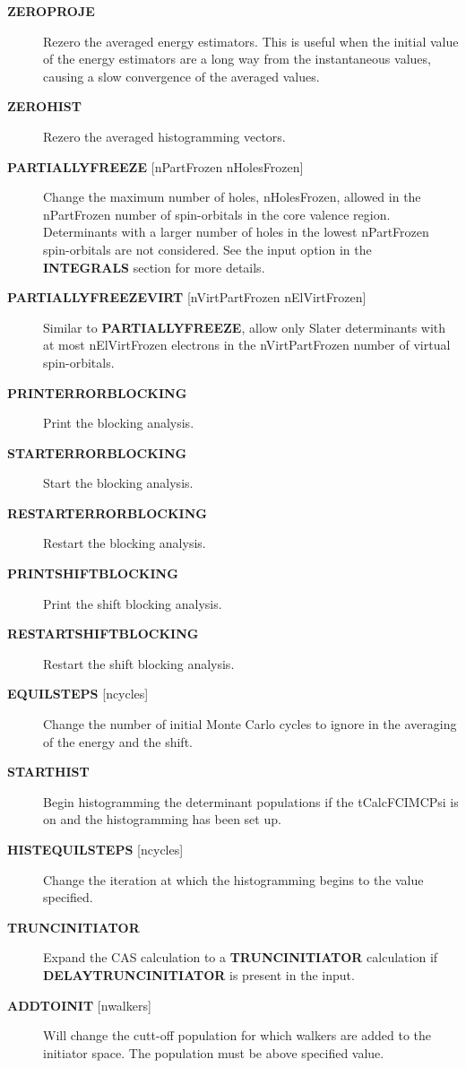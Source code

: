 \documentclass[openany,a4paper,10pt,english]{manual}
\begin{document}
\begin{description}
\item[\textbf{ZEROPROJE}] \leavevmode
Rezero the averaged energy estimators.  This is useful when the initial value of
the energy estimators are a long way from the instantaneous values, causing a
slow convergence of the averaged values.

\item[\textbf{ZEROHIST}] \leavevmode
Rezero the averaged histogramming vectors.

\item[\textbf{PARTIALLYFREEZE} {[}nPartFrozen nHolesFrozen{]}] \leavevmode
Change the maximum number of holes, nHolesFrozen, allowed in the nPartFrozen
number of spin-orbitals in the core valence region.
Determinants with a larger number of holes in the lowest nPartFrozen
spin-orbitals are not considered.
See the input option in the \textbf{INTEGRALS} section for more details.

\item[\textbf{PARTIALLYFREEZEVIRT} {[}nVirtPartFrozen nElVirtFrozen{]}] \leavevmode
Similar to \textbf{PARTIALLYFREEZE}, allow only Slater determinants with
at most nElVirtFrozen electrons in the nVirtPartFrozen number of virtual
spin-orbitals.

\item[\textbf{PRINTERRORBLOCKING}] \leavevmode
Print the blocking analysis.

\item[\textbf{STARTERRORBLOCKING}] \leavevmode
Start the blocking analysis.

\item[\textbf{RESTARTERRORBLOCKING}] \leavevmode
Restart the blocking analysis.

\item[\textbf{PRINTSHIFTBLOCKING}] \leavevmode
Print the shift blocking analysis.

\item[\textbf{RESTARTSHIFTBLOCKING}] \leavevmode
Restart the shift blocking analysis.

\item[\textbf{EQUILSTEPS} {[}ncycles{]}] \leavevmode
Change the number of initial Monte Carlo cycles to ignore in the averaging
of the energy and the shift.

\item[\textbf{STARTHIST}] \leavevmode
Begin histogramming the determinant populations if the tCalcFCIMCPsi
is on and the histogramming has been set up.

\item[\textbf{HISTEQUILSTEPS} {[}ncycles{]}] \leavevmode
Change the iteration at which the histogramming begins to the value
specified.

\item[\textbf{TRUNCINITIATOR}] \leavevmode
Expand the CAS calculation to a \textbf{TRUNCINITIATOR} calculation if
\textbf{DELAYTRUNCINITIATOR} is present in the input.

\item[\textbf{ADDTOINIT} {[}nwalkers{]}] \leavevmode
Will change the cutt-off population for which walkers are added to the
initiator space.  The population must be above specified value.

\end{description}
\end{document}
